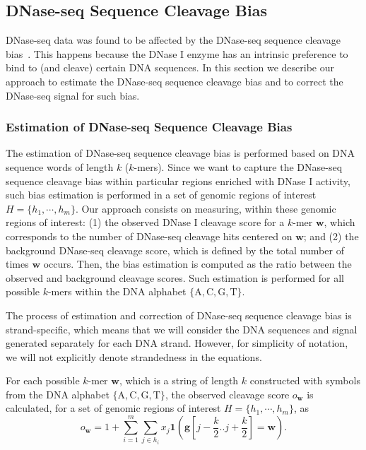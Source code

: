 \subsection{DNase-seq Sequence Cleavage Bias}
\label{sec:dnaseseq.sequence.cleavage.bias}

DNase-seq data was found to be affected by the DNase-seq sequence cleavage bias~\citep{he2014,meyer2014}. This happens because the DNase I enzyme has an intrinsic preference to bind to (and cleave) certain DNA sequences. In this section we describe our approach to estimate the DNase-seq sequence cleavage bias and to correct the DNase-seq signal for such bias.

\subsubsection{Estimation of DNase-seq Sequence Cleavage Bias}

The estimation of DNase-seq sequence cleavage bias is performed based on DNA sequence words of length $k$ ($k$-mers). Since we want to capture the DNase-seq sequence cleavage bias within particular regions enriched with DNase I activity, such bias estimation is performed in a set of genomic regions of interest $H = \{{h}_{1}, \cdots, {h}_{m}\}$. Our approach consists on measuring, within these genomic regions of interest: (1) the observed DNase I cleavage score for a $k$-mer $\mathbf{w}$, which corresponds to the number of DNase-seq cleavage hits centered on $\mathbf{w}$; and (2) the background DNase-seq cleavage score, which is defined by the total number of times $\mathbf{w}$ occurs. Then, the bias estimation is computed as the ratio between the observed and background cleavage scores. Such estimation is performed for all possible $k$-mers within the DNA alphabet $\{\text{A}, \text{C}, \text{G}, \text{T}\}$.

The process of estimation and correction of DNase-seq sequence cleavage bias is strand-specific, which means that we will consider the DNA sequences and signal generated separately for each DNA strand. However, for simplicity of notation, we will not explicitly denote strandedness in the equations.

For each possible $k$-mer $\mathbf{w}$, which is a string of length $k$ constructed with symbols from the DNA alphabet $\{\text{A}, \text{C}, \text{G}, \text{T}\}$, the observed cleavage score ${o}_{\mathbf{w}}$ is calculated, for a set of genomic regions of interest $H = \{h_1, \cdots, h_m\}$, as
\begin{equation}
  \label{eq:obscleav}
  {o}_{\mathbf{w}} = 1 + \sum_{i=1}^{m} \sum_{j \in h_i} {x}_{j} \mathbf{1}\left( \mathbf{g}[j-\frac{k}{2} .. j+\frac{k}{2}] = \mathbf{w}\right).
\end{equation}

